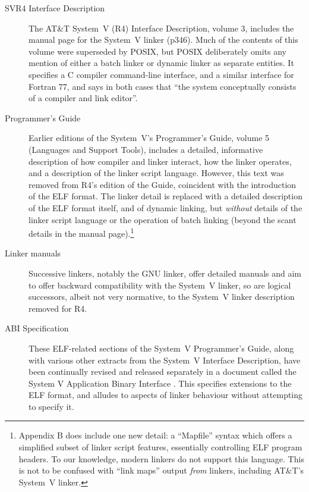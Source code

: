 \begin{description}

\item[SVR4 Interface Description]
The AT\&T System~V (R4) Interface Description, volume 3, includes the manual
page for the System~V linker (p346). 
Much of the contents of this volume were superseded by POSIX, 
but POSIX deliberately omits any mention of either a 
batch linker or dynamic linker as separate entities. 
It specifies a C compiler command-line interface, 
and a similar interface for Fortran 77,
and says in both cases that 
``the system conceptually consists of a compiler and link editor''.

\item[Programmer's Guide] Earlier editions of the System~V's Programmer's Guide, volume 5 (Languages and Support Tools), 
includes a detailed, informative description of how compiler and linker interact,
how the linker operates, and a description of the linker script language.
However, this text was removed from R4's edition of the Guide, 
coincident with the introduction of the ELF format.
The linker detail is replaced with a detailed description of the ELF format itself, 
and of dynamic linking, but \emph{without} details of the linker script language
or the operation of batch linking (beyond the scant details in the manual page).\footnote{Appendix B 
does include one new detail: a ``Mapfile'' syntax which offers a simplified subset 
of linker script features, essentially controlling ELF program headers. 
To our knowledge,  modern linkers do not support this language.
This is not to be confused with ``link maps'' output \emph{from} 
linkers, including AT\&T's System~V linker.}

\item[Linker manuals] Successive linkers, notably the GNU linker, offer detailed manuals
and aim to offer backward compatibility with the System~V linker,
so are logical successors, albeit not very normative, 
to the System~V linker description removed for R4.

\item[ABI Specification] These ELF-related sections of the System~V Programmer's Guide, 
along with various other extracts from the System~V Interface Description,
have been continually revised and released separately
in a document called the System V Application Binary Interface \cite{elf-sco-model}.
This specifies extensions to the ELF format, and alludes to aspects of linker behaviour
without attempting to specify it.


\end{description}
